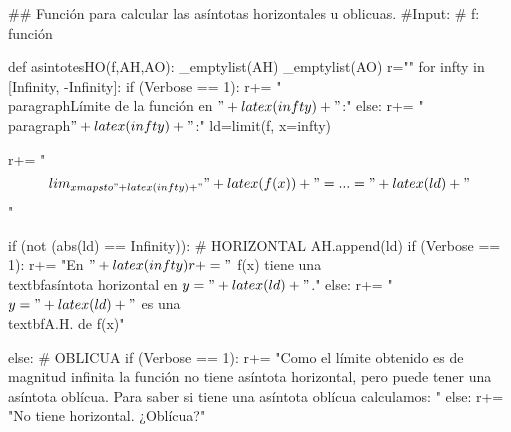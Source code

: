 \begin{sagesilent}
## Función para calcular las asíntotas horizontales u oblicuas.
#Input:
# f: función

def asintotesHO(f,AH,AO):
    _emptylist(AH)
    _emptylist(AO)
    r=""
    for infty in [Infinity, -Infinity]:
        if (Verbose == 1):
            r+= "\\paragraph{Límite de la función en $"+latex(infty)+"$:}"
        else:
            r+= "\\paragraph{$"+latex(infty)+"$:}"
        ld=limit(f, x=infty)  

        r+= "\[\\lim_{x\\mapsto "+latex(infty)+"}" + latex(f(x)) + "= ... = "+latex(ld)+"\]"    

        if (not (abs(ld) == Infinity)): # HORIZONTAL
            AH.append(ld)
            if (Verbose == 1):
                r+= "En $"+latex(infty)
                r+= "$ f(x) tiene una \\textbf{asíntota horizontal} en $y = "+latex(ld)+"$."
            else:
                r+= "$y = "+latex(ld) +" $ es una \\textbf{A.H.} de f(x)"

        else: # OBLICUA
            if (Verbose == 1):
                r+= "Como el límite obtenido es de magnitud infinita la función no tiene asíntota horizontal, pero puede tener una asíntota oblícua. Para saber si tiene una asíntota oblícua calculamos: "
            else:
                r+= "No tiene horizontal. ¿Oblícua?"


\end{sagesilent}
